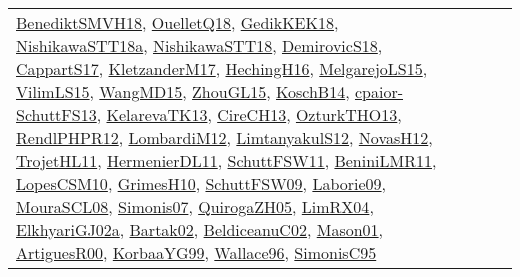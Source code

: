 {\begin{longtable}{lp{3cm}>{\raggedright}p{6cm}>{\raggedright}p{6cm}p{8cm}}
\href{papers/BenediktSMVH18.pdf}{BenediktSMVH18}\cite{BenediktSMVH18}, \href{papers/OuelletQ18.pdf}{OuelletQ18}\cite{OuelletQ18}, \href{articles/GedikKEK18.pdf}{GedikKEK18}\cite{GedikKEK18}, \href{papers/NishikawaSTT18a.pdf}{NishikawaSTT18a}\cite{NishikawaSTT18a}, \href{papers/NishikawaSTT18.pdf}{NishikawaSTT18}\cite{NishikawaSTT18}, \href{papers/DemirovicS18.pdf}{DemirovicS18}\cite{DemirovicS18}, \href{papers/CappartS17.pdf}{CappartS17}\cite{CappartS17}, \href{papers/KletzanderM17.pdf}{KletzanderM17}\cite{KletzanderM17}, \href{papers/HechingH16.pdf}{HechingH16}\cite{HechingH16}, \href{papers/MelgarejoLS15.pdf}{MelgarejoLS15}\cite{MelgarejoLS15}, \href{papers/VilimLS15.pdf}{VilimLS15}\cite{VilimLS15}, \href{articles/WangMD15.pdf}{WangMD15}\cite{WangMD15}, \href{papers/ZhouGL15.pdf}{ZhouGL15}\cite{ZhouGL15}, \href{papers/KoschB14.pdf}{KoschB14}\cite{KoschB14}, \href{papers/cpaior-SchuttFS13.pdf}{cpaior-SchuttFS13}\cite{cpaior-SchuttFS13}, \href{papers/KelarevaTK13.pdf}{KelarevaTK13}\cite{KelarevaTK13}, \href{papers/CireCH13.pdf}{CireCH13}\cite{CireCH13}, \href{articles/OzturkTHO13.pdf}{OzturkTHO13}\cite{OzturkTHO13}, \href{papers/RendlPHPR12.pdf}{RendlPHPR12}\cite{RendlPHPR12}, \href{articles/LombardiM12.pdf}{LombardiM12}\cite{LombardiM12}, \href{articles/LimtanyakulS12.pdf}{LimtanyakulS12}\cite{LimtanyakulS12}, \href{articles/NovasH12.pdf}{NovasH12}\cite{NovasH12}, \href{articles/TrojetHL11.pdf}{TrojetHL11}\cite{TrojetHL11}, \href{papers/HermenierDL11.pdf}{HermenierDL11}\cite{HermenierDL11}, \href{articles/SchuttFSW11.pdf}{SchuttFSW11}\cite{SchuttFSW11}, \href{articles/BeniniLMR11.pdf}{BeniniLMR11}\cite{BeniniLMR11}, \href{articles/LopesCSM10.pdf}{LopesCSM10}\cite{LopesCSM10}, \href{papers/GrimesH10.pdf}{GrimesH10}\cite{GrimesH10}, \href{papers/SchuttFSW09.pdf}{SchuttFSW09}\cite{SchuttFSW09}, \href{papers/Laborie09.pdf}{Laborie09}\cite{Laborie09}, \href{papers/MouraSCL08.pdf}{MouraSCL08}\cite{MouraSCL08}, \href{articles/Simonis07.pdf}{Simonis07}\cite{Simonis07}, \href{papers/QuirogaZH05.pdf}{QuirogaZH05}\cite{QuirogaZH05}, \href{papers/LimRX04.pdf}{LimRX04}\cite{LimRX04}, \href{papers/ElkhyariGJ02a.pdf}{ElkhyariGJ02a}\cite{ElkhyariGJ02a}, \href{papers/Bartak02.pdf}{Bartak02}\cite{Bartak02}, \href{papers/BeldiceanuC02.pdf}{BeldiceanuC02}\cite{BeldiceanuC02}, \href{articles/Mason01.pdf}{Mason01}\cite{Mason01}, \href{articles/ArtiguesR00.pdf}{ArtiguesR00}\cite{ArtiguesR00}, \href{papers/KorbaaYG99.pdf}{KorbaaYG99}\cite{KorbaaYG99}, \href{articles/Wallace96.pdf}{Wallace96}\cite{Wallace96}, \href{papers/SimonisC95.pdf}{SimonisC95}\cite{SimonisC95}\\

\end{longtable}}
